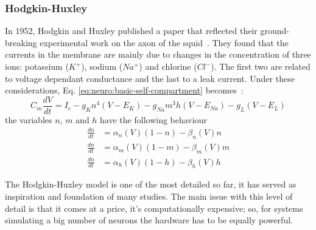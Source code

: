 \subsubsection{Hodgkin-Huxley}
In 1952, Hodgkin and Huxley published a paper that reflected their ground-breaking experimental work on the axon of the squid~\cite{hodgkin-huxley}. They found that the currents in the membrane are mainly due to changes in the concentration of three ions: potassium ($K^{+}$), sodium ($Na^{+}$) and chlorine ($Cl^{-}$). The first two are related to voltage dependant conductance and the last to a leak current. Under these considerations, Eq. \ref{eq:neuro:basic-self-compartment} becomes~\cite{dynamical-systems-Izhikevich2007}:
\begin{equation}
C_{m}\frac{dV}{dt} = I_{e} - g_{K}  n^{4} (V - E_{K}) 
                           - g_{Na} m^{3}h(V - E_{Na})
                           - g_{L}        (V - E_{L})
\label{eq:neuro:hodgkin-huxley}
\end{equation}
the variables $n$, $m$ and $h$ have the following behaviour
\begin{align}
\frac{dn}{dt} &= \alpha_{n}(V) (1 - n) - \beta_{n}(V) n \\[0.5em]
\frac{dn}{dt} &= \alpha_{m}(V) (1 - m) - \beta_{m}(V) m\\[0.5em]
\frac{dn}{dt} &= \alpha_{h}(V) (1 - h) - \beta_{h}(V) h
\end{align}

The Hodgkin-Huxley model is one of the most detailed so far, it has served as inspiration and foundation of many studies. The main issue with this level of detail is that it comes at a price, it's computationally expensive; so, for systems simulating a big number of neurons the hardware has to be equally powerful.

